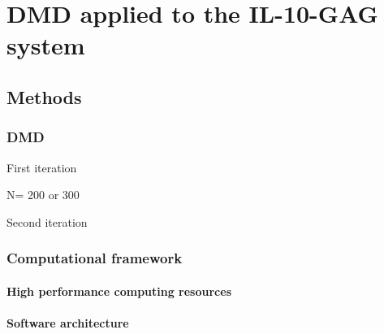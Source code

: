 \chapter{DMD applied to the IL-10-GAG system}

\section{Methods}

\subsection{DMD}


First iteration


N= 200 or 300


Second iteration



\subsection{Computational framework}

\subsubsection{High performance computing resources}

\subsubsection{Software architecture}


